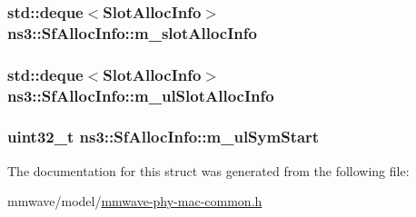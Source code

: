 \subsubsection[{\texorpdfstring{m\+\_\+slot\+Alloc\+Info}{m_slotAllocInfo}}]{\setlength{\rightskip}{0pt plus 5cm}std\+::deque$<${\bf Slot\+Alloc\+Info}$>$ ns3\+::\+Sf\+Alloc\+Info\+::m\+\_\+slot\+Alloc\+Info}\hypertarget{structns3_1_1SfAllocInfo_a6a87109ff89bf270a74ff95a5bbf9231}{}\label{structns3_1_1SfAllocInfo_a6a87109ff89bf270a74ff95a5bbf9231}
\subsubsection[{\texorpdfstring{m\+\_\+ul\+Slot\+Alloc\+Info}{m_ulSlotAllocInfo}}]{\setlength{\rightskip}{0pt plus 5cm}std\+::deque$<${\bf Slot\+Alloc\+Info}$>$ ns3\+::\+Sf\+Alloc\+Info\+::m\+\_\+ul\+Slot\+Alloc\+Info}\hypertarget{structns3_1_1SfAllocInfo_af6fbec6da8a071eeb2b2906ce317a710}{}\label{structns3_1_1SfAllocInfo_af6fbec6da8a071eeb2b2906ce317a710}
\subsubsection[{\texorpdfstring{m\+\_\+ul\+Sym\+Start}{m_ulSymStart}}]{\setlength{\rightskip}{0pt plus 5cm}uint32\+\_\+t ns3\+::\+Sf\+Alloc\+Info\+::m\+\_\+ul\+Sym\+Start}\hypertarget{structns3_1_1SfAllocInfo_afdc93045f3d8e17f1281e3aeae52e4cf}{}\label{structns3_1_1SfAllocInfo_afdc93045f3d8e17f1281e3aeae52e4cf}


The documentation for this struct was generated from the following file\+:\begin{DoxyCompactItemize}
\item 
mmwave/model/\hyperlink{mmwave-phy-mac-common_8h}{mmwave-\/phy-\/mac-\/common.\+h}\end{DoxyCompactItemize}
